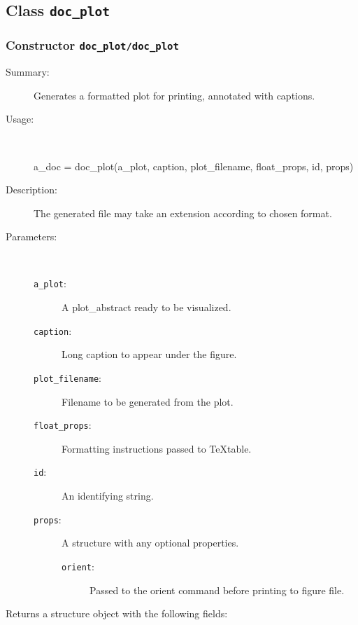 \subsection{Class \texttt{doc\_plot}}%
%
\label{ref_doc_plot}%
\hypertarget{ref_doc_plot}{}%
\subsubsection[Constructor \texttt{doc\_plot}]{Constructor \texttt{doc\_plot/doc\_plot}}%
%
\label{ref_doc_plot__doc_plot}%
\hypertarget{ref_doc_plot__doc_plot}{}%
\begin{description}
\item[Summary:]Generates a formatted plot for printing, annotated with captions.
%
\item[Usage:]~%
\begin{lyxcode}%
a\_doc = doc\_plot(a\_plot, caption, plot\_filename, float\_props, id, props)
%
\end{lyxcode}%
%
\item[Description:]%
The generated file may take an extension according to chosen format.
\item[Parameters:]~
\begin{description}%
\item[\texttt{a\_plot}:]
 A plot\_abstract ready to be visualized.
\item[\texttt{caption}:]
 Long caption to appear under the figure.
\item[\texttt{plot\_filename}:]
  Filename to be generated from the plot.
\item[\texttt{float\_props}:]
 Formatting instructions passed to TeXtable. 
\item[\texttt{id}:]
 An identifying string.
\item[\texttt{props}:]
 A structure with any optional properties.
\begin{description}%
\item[\texttt{orient}:]
 Passed to the orient command before printing to figure file.
\end{description}%
\end{description}%
%
\item[Returns a structure object with the following fields:]~


\end{description}
